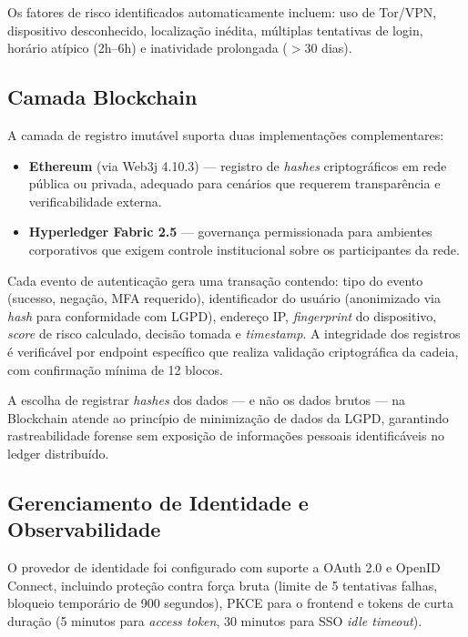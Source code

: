 \documentclass[12pt]{article}
\begin{document}
Os fatores de risco identificados automaticamente incluem: uso de Tor/VPN, dispositivo desconhecido, localização inédita, múltiplas tentativas de login, horário atípico (2h--6h) e inatividade prolongada ($>$30 dias).

\subsection{Camada Blockchain}

A camada de registro imutável suporta duas implementações complementares:

\begin{itemize}[leftmargin=*]
    \item \textbf{Ethereum} (via Web3j 4.10.3) --- registro de \textit{hashes} criptográficos em rede pública ou privada, adequado para cenários que requerem transparência e verificabilidade externa.
    \item \textbf{Hyperledger Fabric 2.5} --- governança permissionada para ambientes corporativos que exigem controle institucional sobre os participantes da rede.
\end{itemize}

Cada evento de autenticação gera uma transação contendo: tipo do evento (sucesso, negação, MFA requerido), identificador do usuário (anonimizado via \textit{hash} para conformidade com LGPD), endereço IP, \textit{fingerprint} do dispositivo, \textit{score} de risco calculado, decisão tomada e \textit{timestamp}. A integridade dos registros é verificável por endpoint específico que realiza validação criptográfica da cadeia, com confirmação mínima de 12 blocos.

A escolha de registrar \textit{hashes} dos dados --- e não os dados brutos --- na Blockchain atende ao princípio de minimização de dados da LGPD, garantindo rastreabilidade forense sem exposição de informações pessoais identificáveis no ledger distribuído.

\subsection{Gerenciamento de Identidade e Observabilidade}

O provedor de identidade foi configurado com suporte a OAuth 2.0 e OpenID Connect, incluindo proteção contra força bruta (limite de 5 tentativas falhas, bloqueio temporário de 900 segundos), PKCE para o frontend e tokens de curta duração (5 minutos para \textit{access token}, 30 minutos para SSO \textit{idle timeout}).
\end{document}
